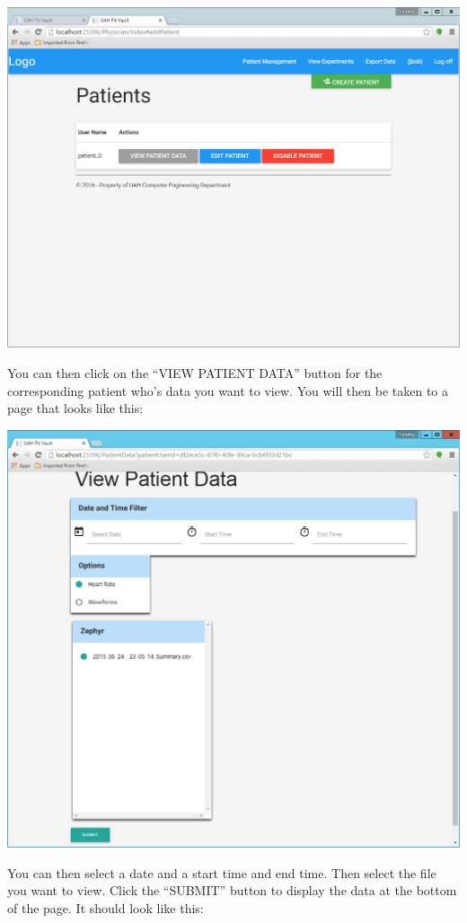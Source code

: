 \documentclass[letterpaper,10pt,english]{sphinxmanual}
\begin{document}
\includegraphics{patient_management.png}

You can then click on the ``VIEW PATIENT DATA'' button for the corresponding patient who's data you want to view. You
will then be taken to a page that looks like this:

\includegraphics{view_patient_data_physician.png}

You can then select a date and a start time and end time. Then select the file you want to view. Click the ``SUBMIT''
button to display the data at the bottom of the page. It should look like this:
\end{document}
